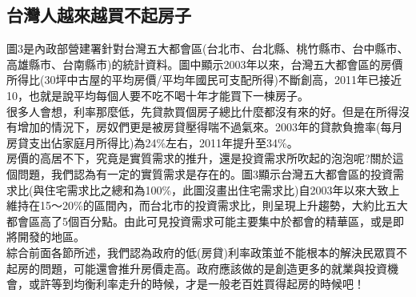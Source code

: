 \documentclass[12pt]{article}
\begin{document}
\begin{CJK}{UTF8}{cwmb}
\section{台灣人越來越買不起房子}

圖3是內政部營建署針對台灣五大都會區(台北市、台北縣、桃竹縣市、台中縣市、高雄縣市、台南縣市)的統計資料。圖中顯示2003年以來，台灣五大都會區的房價所得比(30坪中古屋的平均房價/平均年國民可支配所得)不斷創高，2011年已接近10，也就是說平均每個人要不吃不喝十年才能買下一棟房子。\\

很多人會想，利率那麼低，先貸款買個房子總比什麼都沒有來的好。但是在所得沒有增加的情況下，房奴們更是被房貸壓得喘不過氣來。2003年的貸款負擔率(每月房貸支出佔家庭月所得比)為24\%左右，2011年提升至34\%。\\

房價的高居不下，究竟是實質需求的推升，還是投資需求所吹起的泡泡呢?關於這個問題，我們認為有一定的實質需求是存在的。圖3顯示台灣五大都會區的投資需求比(與住宅需求比之總和為100\%，此圖沒畫出住宅需求比)自2003年以來大致上維持在15～20\%的區間內，而台北市的投資需求比，則呈現上升趨勢，大約比五大都會區高了5個百分點。由此可見投資需求可能主要集中於都會的精華區，或是即將開發的地區。\\

綜合前面各節所述，我們認為政府的低(房貸)利率政策並不能根本的解決民眾買不起房的問題，可能還會推升房價走高。政府應該做的是創造更多的就業與投資機會，或許等到均衡利率走升的時候，才是一般老百姓買得起房的時候吧！

\end{CJK}
\end{document}

